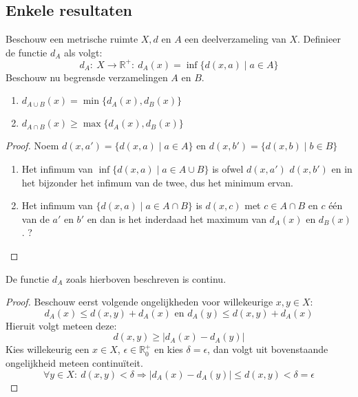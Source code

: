 \documentclass[main.tex]{subfiles}
\begin{document}
\subsection{Enkele resultaten}
\label{sec:enkele-resultaten}

\begin{st}
  Beschouw een metrische ruimte $X,d$ en $A$ een deelverzameling van $X$.
  Definieer de functie $d_{A}$ als volgt:
  \[ d_{A}:\ X \rightarrow \mathbb{R}^{+}:\ d_{A}(x) = \inf\{d(x,a) \mid a\in A\} \]
  Beschouw nu begrensde verzamelingen $A$ en $B$.
  \begin{enumerate}
  \item $d_{A\cup B}(x) = \min\{d_{A}(x),d_{B}(x)\}$
  \item $d_{A\cap B}(x) \ge \max\{d_{A}(x),d_{B}(x)\}$
  \end{enumerate}

  \begin{proof}
    \noindent
    Noem $d(x,a') = \{d(x,a) \mid a\in A\}$ en $d(x,b') = \{d(x,b) \mid b\in B\}$
    \begin{enumerate}
    \item Het infimum van $\inf\{d(x,a) \mid a\in A\cup B\}$ is ofwel $d(x,a')$ $d(x,b')$ en in het bijzonder het infimum van de twee, dus het minimum ervan.
    \item Het infimum van $\{d(x,a) \mid a\in A\cap B\}$ is $d(x,c)$ met $c\in A\cap B$ en $c$ \'e\'en van de $a'$ en $b'$ en dan is het inderdaad het maximum van $d_{A}(x)$ en $d_{B}(x)$.
      ?
    \end{enumerate}
  \end{proof}
\end{st}

\begin{st}
  De functie $d_{A}$ zoals hierboven beschreven is continu.
  
  \begin{proof}
    Beschouw eerst volgende ongelijkheden voor willekeurige $x,y\in X$:
    \[ d_{A}(x) \le d(x,y) + d_{A}(x) \text{ en } d_{A}(y) \le d(x,y) + d_{A}(x) \]
    Hieruit volgt meteen deze:
    \[ d(x,y) \ge |d_{A}(x)-d_{A}(y)| \]
    Kies willekeurig een $x\in X$, $\epsilon \in \mathbb{R}_{0}^{+}$ en kies $\delta = \epsilon$, dan volgt uit bovenstaande ongelijkheid meteen continu\"iteit.
    \[ \forall y\in X:\ d(x,y) < \delta \Rightarrow |d_{A}(x)-d_{A}(y)| \le d(x,y) < \delta = \epsilon \]
    \feed
  \end{proof}
\end{st}
\end{document}
